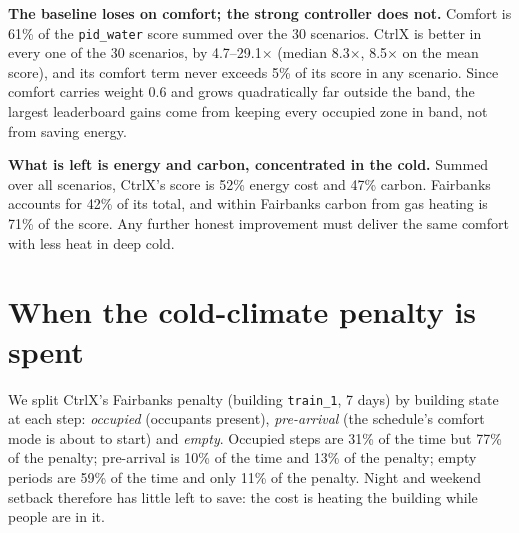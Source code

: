 \documentclass{article}
\begin{document}
\textbf{The baseline loses on comfort; the strong controller does not.} Comfort is 61\% of the \texttt{pid\_water} score summed over the 30 scenarios. CtrlX is better in every one of the 30 scenarios, by 4.7--29.1$\times$ (median 8.3$\times$, 8.5$\times$ on the mean score), and its comfort term never exceeds 5\% of its score in any scenario. Since comfort carries weight 0.6 and grows quadratically far outside the band, the largest leaderboard gains come from keeping every occupied zone in band, not from saving energy.

\textbf{What is left is energy and carbon, concentrated in the cold.} Summed over all scenarios, CtrlX's score is 52\% energy cost and 47\% carbon. Fairbanks accounts for 42\% of its total, and within Fairbanks carbon from gas heating is 71\% of the score. Any further honest improvement must deliver the same comfort with less heat in deep cold.

\section{When the cold-climate penalty is spent}\label{sec:when}
We split CtrlX's Fairbanks penalty (building \texttt{train\_1}, 7 days) by building state at each step: \emph{occupied} (occupants present), \emph{pre-arrival} (the schedule's comfort mode is about to start) and \emph{empty}. Occupied steps are 31\% of the time but 77\% of the penalty; pre-arrival is 10\% of the time and 13\% of the penalty; empty periods are 59\% of the time and only 11\% of the penalty. Night and weekend setback therefore has little left to save: the cost is heating the building while people are in it.
\end{document}
